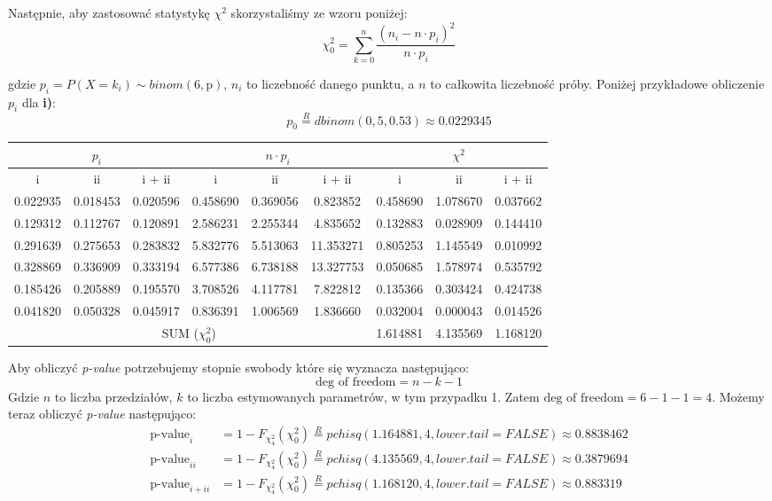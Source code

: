 \documentclass{article}
\begin{document}
Następnie, aby zastosować statystykę $\chi^2$ skorzystaliśmy ze wzoru poniżej:
\[ \chi^2_0 = \sum_{k=0}^n \frac{(n_i - n \cdot p_i)^2}{n \cdot p_i} \]

gdzie $p_i = P(X = k_i) \sim binom(6, \text{\^p})$, $n_i$ to liczebność danego punktu, a $n$ to całkowita liczebność próby. Poniżej przykładowe obliczenie $p_i$ dla \textbf{i)}:
\[ p_0 \overset{R}{=} dbinom(0, 5, 0.53) \approx 0.0229345 \]

\begin{center} \scriptsize \begin{tabular}{|c|c|c|c|c|c|c|c|c|} \hline
\multicolumn{3}{|c|}{$p_i$} & \multicolumn{3}{|c|}{$n \cdot p_i$} & \multicolumn{3}{|c|}{$\chi^2$} \\ \hline
i & ii & i + ii & i & ii & i + ii & i & ii & i + ii \\ \hline
0.022935 & 0.018453 & 0.020596 & 0.458690 & 0.369056 &	0.823852 & 0.458690 & 1.078670 &	0.037662 \\ \hline
0.129312 & 0.112767	& 0.120891 & 2.586231 & 2.255344 &	4.835652 & 0.132883	& 0.028909 &	0.144410 \\ \hline
0.291639 & 0.275653	& 0.283832 & 5.832776 & 5.513063 &	11.353271 & 0.805253 & 1.145549 &	0.010992 \\ \hline
0.328869 & 0.336909	& 0.333194 & 6.577386 & 6.738188 &	13.327753	 & 0.050685 & 1.578974 &	0.535792 \\ \hline
0.185426 & 0.205889	& 0.195570 & 3.708526 & 4.117781 &	7.822812 & 0.135366	& 0.303424 &	0.424738 \\ \hline
0.041820 & 0.050328	& 0.045917 & 0.836391 & 1.006569 &	1.836660 & 0.032004	& 0.000043 &	0.014526 \\ \hline
\multicolumn{6}{|c|}{SUM ($\chi^2_0$)} & 1.614881 & 4.135569 &	1.168120 \\ \hline
\end{tabular} \end{center}

Aby obliczyć \textit{p-value} potrzebujemy stopnie swobody które się wyznacza następująco:
\[ \text{deg of freedom} = n - k - 1 \]
Gdzie $n$ to liczba przedziałów, $k$ to liczba estymowanych parametrów, w tym przypadku 1. Zatem $\text{deg of freedom} = 6 - 1 - 1 = 4$. Możemy teraz obliczyć \textit{p-value} następująco:
\begin{align*}
\text{p-value}_i & = 1 - F_{\chi^2_4}(\chi^2_0) \overset{R}{=} pchisq(1.164881, 4, lower.tail = FALSE) \approx 0.8838462 \\
\text{p-value}_{ii} & = 1 - F_{\chi^2_4}(\chi^2_0) \overset{R}{=} pchisq(4.135569, 4, lower.tail = FALSE) \approx 0.3879694 \\
\text{p-value}_{i + ii} & = 1 - F_{\chi^2_4}(\chi^2_0) \overset{R}{=} pchisq(1.168120, 4, lower.tail = FALSE) \approx 0.883319 
\end{align*}
\end{document}
